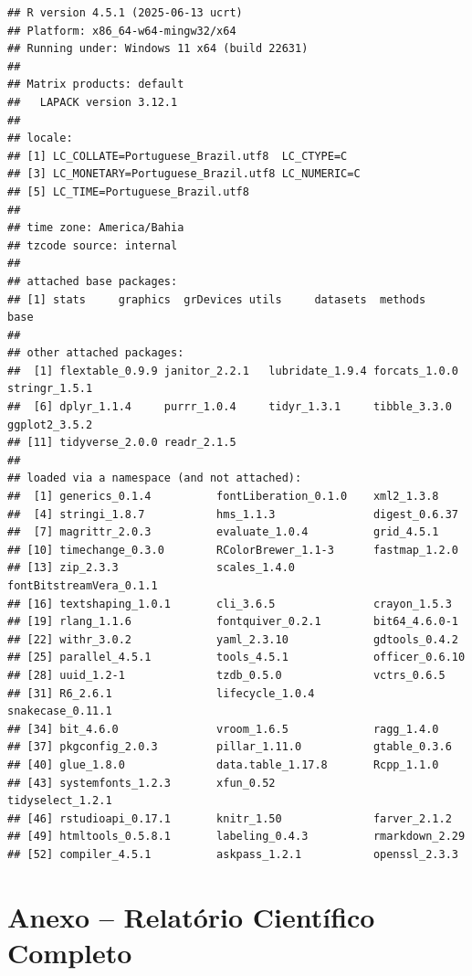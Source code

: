 \documentclass[
]{article}
\begin{document}
\begin{verbatim}
## R version 4.5.1 (2025-06-13 ucrt)
## Platform: x86_64-w64-mingw32/x64
## Running under: Windows 11 x64 (build 22631)
## 
## Matrix products: default
##   LAPACK version 3.12.1
## 
## locale:
## [1] LC_COLLATE=Portuguese_Brazil.utf8  LC_CTYPE=C                        
## [3] LC_MONETARY=Portuguese_Brazil.utf8 LC_NUMERIC=C                      
## [5] LC_TIME=Portuguese_Brazil.utf8    
## 
## time zone: America/Bahia
## tzcode source: internal
## 
## attached base packages:
## [1] stats     graphics  grDevices utils     datasets  methods   base     
## 
## other attached packages:
##  [1] flextable_0.9.9 janitor_2.2.1   lubridate_1.9.4 forcats_1.0.0   stringr_1.5.1  
##  [6] dplyr_1.1.4     purrr_1.0.4     tidyr_1.3.1     tibble_3.3.0    ggplot2_3.5.2  
## [11] tidyverse_2.0.0 readr_2.1.5    
## 
## loaded via a namespace (and not attached):
##  [1] generics_0.1.4          fontLiberation_0.1.0    xml2_1.3.8             
##  [4] stringi_1.8.7           hms_1.1.3               digest_0.6.37          
##  [7] magrittr_2.0.3          evaluate_1.0.4          grid_4.5.1             
## [10] timechange_0.3.0        RColorBrewer_1.1-3      fastmap_1.2.0          
## [13] zip_2.3.3               scales_1.4.0            fontBitstreamVera_0.1.1
## [16] textshaping_1.0.1       cli_3.6.5               crayon_1.5.3           
## [19] rlang_1.1.6             fontquiver_0.2.1        bit64_4.6.0-1          
## [22] withr_3.0.2             yaml_2.3.10             gdtools_0.4.2          
## [25] parallel_4.5.1          tools_4.5.1             officer_0.6.10         
## [28] uuid_1.2-1              tzdb_0.5.0              vctrs_0.6.5            
## [31] R6_2.6.1                lifecycle_1.0.4         snakecase_0.11.1       
## [34] bit_4.6.0               vroom_1.6.5             ragg_1.4.0             
## [37] pkgconfig_2.0.3         pillar_1.11.0           gtable_0.3.6           
## [40] glue_1.8.0              data.table_1.17.8       Rcpp_1.1.0             
## [43] systemfonts_1.2.3       xfun_0.52               tidyselect_1.2.1       
## [46] rstudioapi_0.17.1       knitr_1.50              farver_2.1.2           
## [49] htmltools_0.5.8.1       labeling_0.4.3          rmarkdown_2.29         
## [52] compiler_4.5.1          askpass_1.2.1           openssl_2.3.3
\end{verbatim}

\section{Anexo -- Relatório Científico
Completo}\label{anexo-relatuxf3rio-cientuxedfico-completo}
\end{document}
